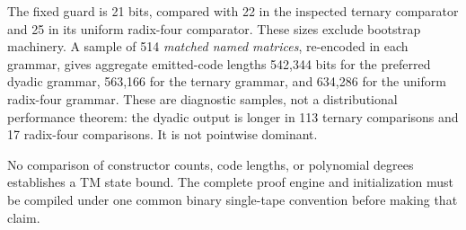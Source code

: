 The fixed guard is 21 bits, compared with 22 in the inspected ternary comparator and 25 in its uniform radix-four comparator. These sizes exclude bootstrap machinery. A sample of 514 \emph{matched named matrices}, re-encoded in each grammar, gives aggregate emitted-code lengths 542,344 bits for the preferred dyadic grammar, 563,166 for the ternary grammar, and 634,286 for the uniform radix-four grammar. These are diagnostic samples, not a distributional performance theorem: the dyadic output is longer in 113 ternary comparisons and 17 radix-four comparisons. It is not pointwise dominant.

No comparison of constructor counts, code lengths, or polynomial degrees establishes a TM state bound. The complete proof engine and initialization must be compiled under one common binary single-tape convention before making that claim.
